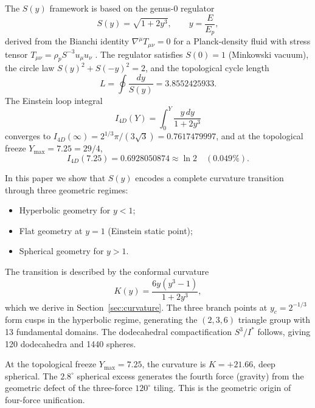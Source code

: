 \documentclass[a4paper,7pt,oneside,openany]{book}
\begin{document}
The \(S(y)\) framework is based on the genus-\(0\) regulator
\begin{equation}
S(y) = \sqrt{1 + 2y^3}, \qquad y = \frac{E}{E_p},
\label{eq:S}
\end{equation}
derived from the Bianchi identity \(\nabla^\mu T_{\mu\nu} = 0\) for a Planck-density fluid with stress tensor \(T_{\mu\nu} = \rho_p S^{-3}u_\mu u_\nu\) \cite{Roy2026a}. The regulator satisfies \(S(0) = 1\) (Minkowski vacuum), the circle law \(S(y)^2 + S(-y)^2 = 2\), and the topological cycle length
\begin{equation}
L = \oint \frac{dy}{S(y)} = 3.8552425933.
\end{equation}
The Einstein loop integral
\begin{equation}
I_{4D}(Y) = \int_0^Y \frac{y\,dy}{1+2y^3}
\end{equation}
converges to \(I_{4D}(\infty) = 2^{1/3}\pi/(3\sqrt{3}) = 0.7617479997\), and at the topological freeze \(Y_{\max} = 7.25 = 29/4\),
\begin{equation}
I_{4D}(7.25) = 0.6928050874 \approx \ln 2 \quad (0.049\%).
\end{equation}

In this paper we show that \(S(y)\) encodes a complete curvature transition through three geometric regimes:
\begin{itemize}
\item Hyperbolic geometry for \(y < 1\);
\item Flat geometry at \(y = 1\) (Einstein static point);
\item Spherical geometry for \(y > 1\).
\end{itemize}
The transition is described by the conformal curvature
\begin{equation}
K(y) = \frac{6y(y^3-1)}{1+2y^3},
\label{eq:K}
\end{equation}
which we derive in Section~\ref{sec:curvature}. The three branch points at \(y_c = 2^{-1/3}\) form cusps in the hyperbolic regime, generating the \((2,3,6)\) triangle group with 13 fundamental domains. The dodecahedral compactification \(S^3/I^*\) follows, giving 120 dodecahedra and 1440 spheres.

At the topological freeze \(Y_{\max} = 7.25\), the curvature is \(K = +21.66\), deep spherical. The \(2.8^\circ\) spherical excess generates the fourth force (gravity) from the geometric defect of the three-force \(120^\circ\) tiling. This is the geometric origin of four-force unification.

\end{document}
